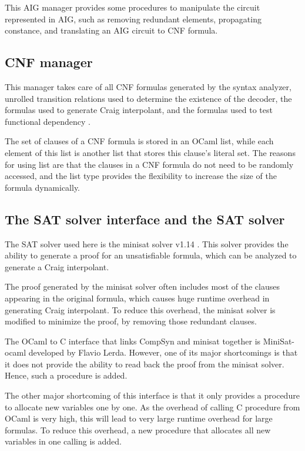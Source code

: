 \documentclass[runningheads,a4paper]{llncs}
\begin{document}
This AIG manager provides some procedures to manipulate the circuit represented in AIG,
such as removing redundant elements,
propagating constance,
and translating an AIG circuit to CNF formula.

\subsection{CNF manager}

This manager takes care of all CNF formulas generated by the syntax analyzer,
unrolled transition relations used to determine the existence of the decoder,
the formulas used to generate Craig interpolant,
and the formulas used to test functional dependency \cite{funcdep}.

The set of clauses of a CNF formula is stored in an OCaml list,
while each element of this list is another list that stores this clause's literal set.
The reasons for using list are that the clauses in a CNF formula do not need to be randomly accessed,
and the list type provides the flexibility to increase the size of the formula dynamically.

\subsection{The SAT solver interface and the SAT solver}

The SAT solver used here is the minisat solver v1.14 \cite{EXTSAT}.
This solver provides the ability to generate a proof for an unsatisfiable formula,
which can be analyzed to generate a Craig interpolant.

The proof generated by the minisat solver often includes most of the clauses appearing in the original formula,
which causes huge runtime overhead in generating Craig interpolant.
To reduce this overhead,
the minisat solver is modified to minimize the proof,
by removing those redundant clauses.

The OCaml to C interface that links CompSyn and minisat together is MiniSat-ocaml \cite{ocamlcbin} developed by Flavio Lerda.
However,
one of its major shortcomings is that it does not provide the ability to read back the proof from the minisat solver.
Hence,
such a procedure is added.

The other major shortcoming of this interface is that it only provides a procedure to allocate new variables one by one.
As the overhead of calling C procedure from OCaml is very high,
this will lead to very large runtime overhead for large formulas.
To reduce this overhead,
a new procedure that allocates all new variables in one calling is added.
\end{document}
